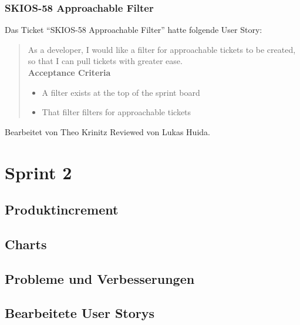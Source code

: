 \subsubsection{SKIOS-58 Approachable Filter}
Das Ticket \enquote{SKIOS-58 Approachable Filter} hatte folgende User Story:
\begin{quotation}
    As a developer, I would like a filter for approachable tickets to be created, so that I can pull tickets with greater ease.\\
    \textbf{Acceptance Criteria}
    \begin{itemize}
        \item A filter exists at the top of the sprint board
        \item That filter filters for approachable tickets
    \end{itemize}
\end{quotation}
Bearbeitet von Theo Krinitz
Reviewed von Lukas Huida.


\section{Sprint 2}
\subsection{Produktincrement}
\subsection{Charts}
\subsection{Probleme und Verbesserungen}

\subsection{Bearbeitete User Storys}

